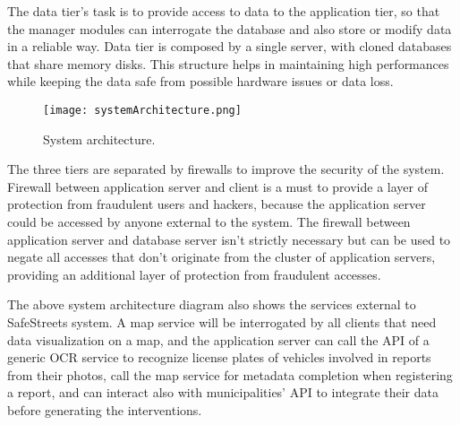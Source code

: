 The data tier's task is to provide access to data to the application tier, so that the manager modules can interrogate the database and also store or modify data in a reliable way. Data tier is composed by a single server, with cloned databases that share memory disks. This structure helps in maintaining high performances while keeping the data safe from possible hardware issues or data loss.

\begin{figure}[H]
	\centering
	\texttt{[image: systemArchitecture.png]}
	\caption{System architecture.}
\end{figure}

The three tiers are separated by firewalls to improve the security of the system. Firewall between application server and client is a must to provide a layer of protection from fraudulent users and hackers, because the application server could be accessed by anyone external to the system. The firewall between application server and database server isn't strictly necessary but can be used to negate all accesses that don't originate from the cluster of application servers, providing an additional layer of protection from fraudulent accesses.

The above system architecture diagram also shows the services external to SafeStreets system. A map service will be interrogated by all clients that need data visualization on a map, and the application server can call the API of a generic OCR service to recognize license plates of vehicles involved in reports from their photos, call the map service for metadata completion when registering a report, and can interact also with municipalities' API to integrate their data before generating the interventions.